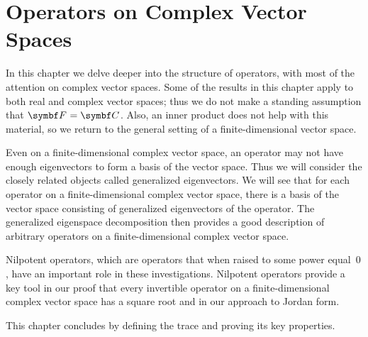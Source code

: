 
\chapter{Operators on Complex Vector Spaces} \label{operators_complex_vs} %

In this chapter we delve deeper into the structure of operators, with most of the attention on complex vector spaces. Some of the results in this chapter apply to both real and complex vector spaces; thus we do not make a standing assumption that $\F{} = \C{}$. Also, an inner product does not help with this material, so we return to the general setting of a finite-dimensional vector space.

Even on a finite-dimensional complex vector space, an operator may not have enough eigenvectors to form a basis of the vector space. Thus we will consider the closely related objects called generalized eigenvectors. We will see that for each operator on a finite-dimensional complex vector space, there is a basis of the vector space consisting of generalized eigenvectors of the operator. The generalized eigenspace decomposition then provides a good description of arbitrary operators on a finite-dimensional complex vector space.

Nilpotent operators, which are operators that when raised to some power equal~$0$, have an important role in these investigations. Nilpotent operators provide a key tool in our proof that every invertible operator on a finite-dimensional complex vector space has a square root and in our approach to Jordan form.

This chapter concludes by defining the trace and proving its key properties.

